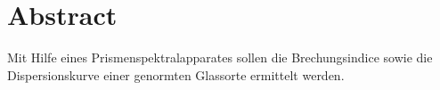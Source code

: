 \section{Abstract}
\label{sec:Abstract}
Mit Hilfe eines Prismenspektralapparates sollen die Brechungsindice sowie die Dispersionskurve einer genormten Glassorte ermittelt werden.